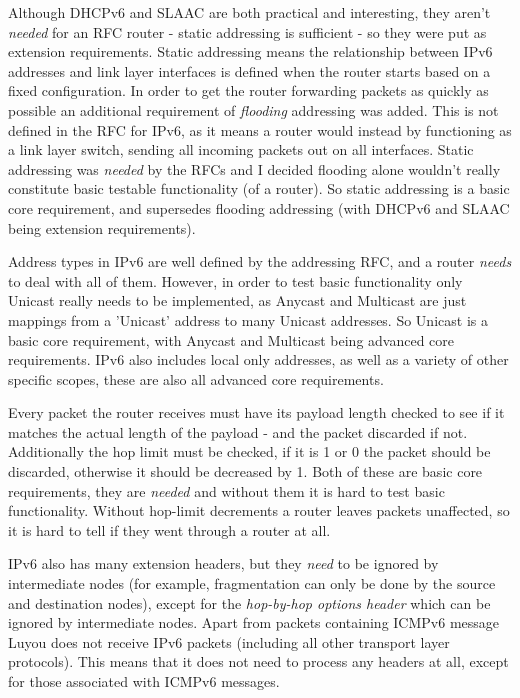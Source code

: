 \documentclass[12pt,a4paper,twoside,openright]{report}
\begin{document}
Although DHCPv6 and SLAAC are both practical and interesting, they aren't \textit{needed} for an RFC router - static addressing is sufficient - so they were put as extension requirements.  Static addressing means the relationship between IPv6 addresses and link layer interfaces is defined when the router starts based on a fixed configuration. In order to get the router forwarding packets as quickly as possible an additional requirement of \textit{flooding} addressing was added.  This is not defined in the RFC for IPv6, as it means a router would instead by functioning as a link layer switch, sending all incoming packets out on all interfaces. Static addressing was \textit{needed} by the RFCs and I decided flooding alone wouldn't really constitute basic testable functionality (of a router). So static addressing is a basic core requirement, and supersedes flooding addressing (with DHCPv6 and SLAAC being extension requirements).

Address types in IPv6 are well defined by the addressing RFC\cite{ipv6_rfc_adr}, and a router \textit{needs} to deal with all of them.  However, in order to test basic functionality only Unicast really needs to be implemented, as Anycast and Multicast are just mappings from a 'Unicast' address to many Unicast addresses. So Unicast is a basic core requirement, with Anycast and Multicast being advanced core requirements. IPv6 also includes local only addresses, as well as a variety of other specific scopes, these are also all advanced core requirements.

\bigskip

Every packet the router receives must have its payload length checked to see if it matches the actual length of the payload - and the packet discarded if not.  Additionally the hop limit must be checked, if it is 1 or 0 the packet should be discarded, otherwise it should be decreased by 1.  Both of these are basic core requirements, they are \textit{needed} and without them it is hard to test basic functionality. Without hop-limit decrements a router leaves packets unaffected, so it is hard to tell if they went through a router at all.

IPv6 also has many extension headers, but they \textit{need} to be ignored by intermediate nodes (for example, fragmentation can only be done by the source and destination nodes), except for the \textit{hop-by-hop options header} which can be ignored by intermediate nodes. Apart from packets containing ICMPv6 message Luyou does not receive IPv6 packets (including all other transport layer protocols).  This means that it does not need to process any headers at all, except for those associated with ICMPv6 messages.
\end{document}

